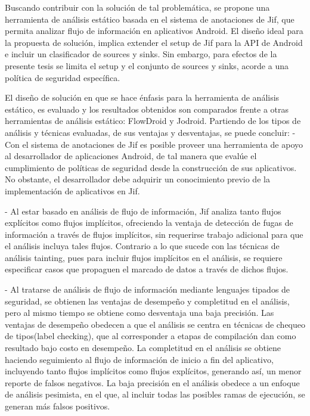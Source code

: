 Buscando contribuir con la solución de tal problemática, se propone una
herramienta de análisis estático basada en el sistema de anotaciones de Jif, que
permita analizar flujo de información en aplicativos Android. El diseño ideal
para la propuesta de solución, implica extender el setup de Jif para la API de
Android e incluir un clasificador de sources y sinks. Sin embargo, para efectos
de la presente tesis se limita el setup y el conjunto de sources y sinks, acorde
a una política de seguridad específica.

El diseño de solución en que se hace énfasis para la herramienta de análisis
estático, es evaluado y los resultados obtenidos son comparados frente a otras
herramientas de análisis estático: FlowDroid y Jodroid. Partiendo de los tipos
de análisis y técnicas evaluadas, de sus ventajas y desventajas, se
puede concluir:\newline 
- Con el sistema de anotaciones de Jif es posible proveer una
herramienta de apoyo al desarrollador de aplicaciones Android, de tal manera que evalúe el
cumplimiento de políticas de seguridad desde la construcción de sus aplicativos.\\
No obstante, el desarrollador debe adquirir un conocimiento previo de la
implementación de aplicativos en Jif.

- Al estar basado en análisis de flujo de información, Jif analiza tanto flujos
explícitos como flujos implícitos, ofreciendo la ventaja de detección de fugas
de información a través de flujos implícitos, sin requerirse trabajo adicional
para que el análisis incluya tales flujos. Contrario a lo que sucede con las
técnicas de análisis tainting, pues para incluir flujos implícitos en el
análisis, se requiere especificar casos que propaguen el marcado de datos a
través de dichos flujos.

- Al tratarse de análisis de flujo de información mediante lenguajes tipados de
seguridad, se obtienen las ventajas de desempeño y completitud en el análisis,
pero al mismo tiempo se obtiene como desventaja una baja precisión.\newline 
Las ventajas de desempeño obedecen a que el análisis se centra en técnicas de
chequeo de tipos(label checking), que al corresponder a etapas de compilación
dan como resultado bajo costo en desempeño.\newline
La completitud en el análisis se obtiene  haciendo seguimiento al flujo de
información de inicio a fin del aplicativo\cite{LanguageIFS-2013}, incluyendo
tanto flujos implícitos como flujos explícitos, generando así, un menor 
reporte de falsos negativos.\newline 
La baja precisión en el análisis obedece a
un enfoque de análisis pesimista, en el que, al incluir todas las posibles ramas de ejecución, se generan más
falsos positivos.

